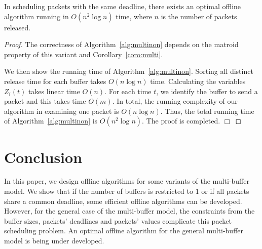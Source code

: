 \documentclass[final, 11pt]{article}
\begin{document}
\begin{theorem}
In scheduling packets with the same deadline, there exists an optimal offline algorithm running in $O(n^2 \log n)$ time, where $n$ is the number of packets released.
\label{theorem:nonuniformoff}
\end{theorem}

\begin{proof}
The correctness of Algorithm~\ref{alg:multinon} depends on the matroid property of this variant and Corollary~\ref{coro:multi}.

We then show the running time of Algorithm~\ref{alg:multinon}. Sorting all distinct release time for each buffer takes $O(n \log n)$ time. Calculating the variables $Z_i(t)$ takes linear time $O(n)$. For each time $t$, we identify the buffer to send a packet and this takes time $O(m)$. In total, the running complexity of our algorithm in examining one packet is $O(n \log n)$. Thus, the total running time of Algorithm~\ref{alg:multinon} is $O(n^2 \log n)$. The proof is completed. $\Box$
\end{proof}


\section{Conclusion}

In this paper, we design offline algorithms for some variants of the multi-buffer model. We show that if the number of buffers is restricted to $1$ or if all packets share a common deadline, some efficient offline algorithms can be developed. However, for the general case of the multi-buffer model, the constraints from the buffer sizes, packets' deadlines and packets' values complicate this packet scheduling problem. An optimal offline algorithm for the general multi-buffer model is being under developed.




\end{document}
